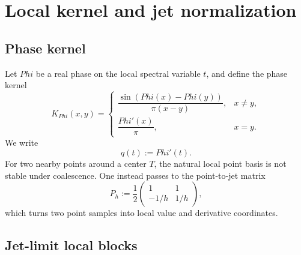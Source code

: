 \documentclass[11pt,a4paper]{amsart}
\def\Phi{Phi}%
\theoremstyle{plain}
\theoremstyle{definition}
\newcommand{\Ph}{\Phi}
\begin{document}
\section{Local kernel and jet normalization}

\subsection{Phase kernel}

Let $\Ph$ be a real phase on the local spectral variable $t$, and define the phase kernel
\begin{equation}\label{eq:phase-kernel}
K_{\Ph}(x,y)=
\begin{cases}
\dfrac{\sin(\Ph(x)-\Ph(y))}{\pi(x-y)}, & x\neq y,\\[1ex]
\dfrac{\Ph'(x)}{\pi}, & x=y.
\end{cases}
\end{equation}
We write
\[
q(t):=\Ph'(t).
\]
For two nearby points around a center $T$, the natural local point basis is not stable under coalescence. One instead passes to the point-to-jet matrix
\begin{equation}\label{eq:point-to-jet}
P_h:=\frac12
\begin{pmatrix}
1 & 1\\[1ex]
-1/h & 1/h
\end{pmatrix},
\end{equation}
which turns two point samples into local value and derivative coordinates.

\subsection{Jet-limit local blocks}
\end{document}
